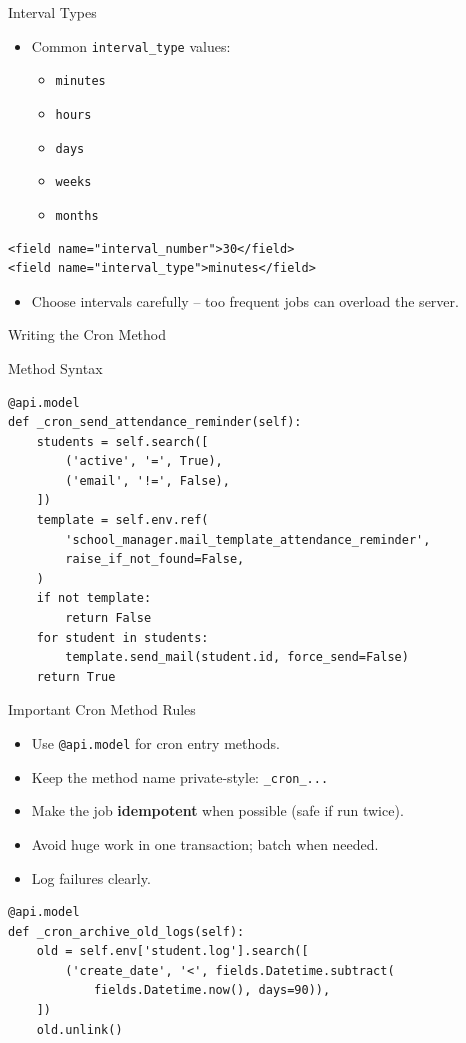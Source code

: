 \begin{frame}[fragile]{Interval Types}
	\begin{itemize}
		\item Common \texttt{interval\_type} values:
		\begin{itemize}
			\item \texttt{minutes}
			\item \texttt{hours}
			\item \texttt{days}
			\item \texttt{weeks}
			\item \texttt{months}
		\end{itemize}
	\end{itemize}
\begin{lstlisting}[style=xml]
<field name="interval_number">30</field>
<field name="interval_type">minutes</field>
\end{lstlisting}
	\begin{itemize}
		\item Choose intervals carefully -- too frequent jobs can overload the server.
	\end{itemize}
\end{frame}

\begin{frame}[fragile]{Writing the Cron Method}
\begin{block}{Method Syntax}
\begin{lstlisting}
@api.model
def _cron_send_attendance_reminder(self):
	students = self.search([
		('active', '=', True),
		('email', '!=', False),
	])
	template = self.env.ref(
		'school_manager.mail_template_attendance_reminder',
		raise_if_not_found=False,
	)
	if not template:
		return False
	for student in students:
		template.send_mail(student.id, force_send=False)
	return True
\end{lstlisting}
\end{block}
\end{frame}

\begin{frame}[fragile]{Important Cron Method Rules}
	\begin{itemize}
		\item Use \texttt{@api.model} for cron entry methods.
		\item Keep the method name private-style: \texttt{\_cron\_...}
		\item Make the job \textbf{idempotent} when possible (safe if run twice).
		\item Avoid huge work in one transaction; batch when needed.
		\item Log failures clearly.
	\end{itemize}
\begin{lstlisting}
@api.model
def _cron_archive_old_logs(self):
	old = self.env['student.log'].search([
		('create_date', '<', fields.Datetime.subtract(
			fields.Datetime.now(), days=90)),
	])
	old.unlink()
\end{lstlisting}
\end{frame}

